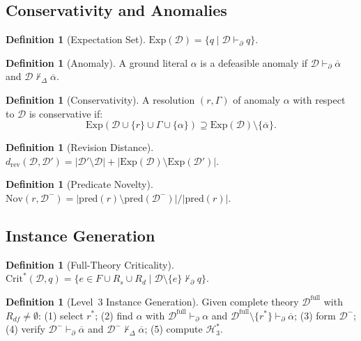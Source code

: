 \documentclass{article}
\theoremstyle{definition}
\newtheorem{definition}[theorem]{Definition}
\newcommand{\D}{\mathcal{D}}
\newcommand{\Dm}{\mathcal{D}^{-}}
\newcommand{\Dfull}{\mathcal{D}^{\mathrm{full}}}
\newcommand{\Rgold}{\mathcal{H}^{*}_3}
\newcommand{\Rs}{R_s}
\newcommand{\Rd}{R_d}
\newcommand{\Rdf}{R_{df}}
\newcommand{\CritStar}{\mathrm{Crit}^{*}}
\newcommand{\Exp}{\mathrm{Exp}}
\newcommand{\Nov}{\mathrm{Nov}}
\newcommand{\pDelta}{\vdash_{\Delta}}
\newcommand{\pPartial}{\vdash_{\partial}}
\newcommand{\comp}[1]{\overline{#1}}
\begin{document}
\subsection{Conservativity and Anomalies}

\begin{definition}[Expectation Set]
$\Exp(\D) = \{q \mid \D \pPartial q\}$.
\end{definition}

\begin{definition}[Anomaly]\label{def:anomclass}
A ground literal $\alpha$ is a defeasible anomaly if $\D \pPartial \comp{\alpha}$ and $\D \not\pDelta \comp{\alpha}$.
\end{definition}

\begin{definition}[Conservativity]\label{def:conserv}
A resolution $(r, \Gamma)$ of anomaly $\alpha$ with respect to $\D$ is conservative if:
\[
    \Exp(\D \cup \{r\} \cup \Gamma \cup \{\alpha\}) \supseteq \Exp(\D) \setminus \{\comp{\alpha}\}.
\]
\end{definition}

\begin{definition}[Revision Distance]\label{def:revdist}
$d_{\mathrm{rev}}(\D, \D') = |\D' \setminus \D| + |\Exp(\D) \setminus \Exp(\D')|$.
\end{definition}

\begin{definition}[Predicate Novelty]\label{def:novelty}
$\Nov(r, \Dm) = |\mathrm{pred}(r) \setminus \mathrm{pred}(\Dm)| / |\mathrm{pred}(r)|$.
\end{definition}

\subsection{Instance Generation}

\begin{definition}[Full-Theory Criticality]\label{def:fullcrit}
$\CritStar(\D, q) = \{e \in F \cup \Rs \cup \Rd \mid \D \setminus \{e\} \not\pPartial q\}$.
\end{definition}

\begin{definition}[Level~3 Instance Generation]\label{def:level3gen}
Given complete theory $\Dfull$ with $\Rdf \neq \emptyset$: (1) select $r^*$; (2) find $\alpha$ with $\Dfull \pPartial \alpha$ and $\Dfull \setminus \{r^*\} \pPartial \comp{\alpha}$; (3) form $\Dm$; (4) verify $\Dm \pPartial \comp{\alpha}$ and $\Dm \not\pDelta \comp{\alpha}$; (5) compute $\Rgold$.
\end{definition}
\end{document}
